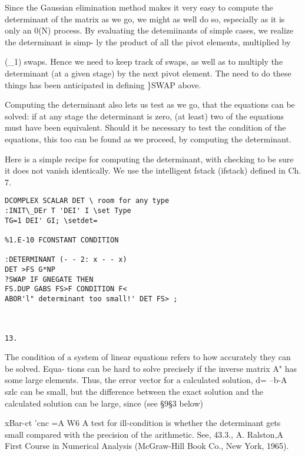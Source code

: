 {{%


Since the Gaussian elimination method makes it very easy to
compute the determinant of the matrix as we go, we might as well
do so, especially as it is only an 0(N) process. By evaluating the
detemiinants of simple cases, we realize the determinant is simp-
ly the product of all the pivot elements, multiplied by

(\_1) swaps. Hence we need to keep track of swaps, as well as to
multiply the determinant (at a given stage) by the next pivot
element. The need to do these things has been anticipated in
defining \}SWAP above.

Computing the determinant also lets us test as we go, that the
equations can be solved: if at any stage the determinant is zero,
(at least) two of the equations must have been equivalent. Should
it be necessary to test the condition of the equations, this too
can be found as we proceed, by computing the determinant.

Here is a simple recipe for computing the determinant, with
checking to be sure it does not vanish identically. We use the
intelligent fstack (ifstack) defined in Ch. 7.

\begin{verbatim}
DCOMPLEX SCALAR DET \ room for any type
:INIT\_DEr T 'DEI' I \set Type
TG=1 DEI' GI; \setdet=

%1.E-10 FCONSTANT CONDITION

:DETERMINANT (- - 2: x - - x)
DET >FS G*NP
?SWAP IF GNEGATE THEN
FS.DUP GABS FS>F CONDITION F<
ABOR'l" determinant too small!' DET FS> ;

 

13.
\end{verbatim} 

The condition of a system of linear equations refers to how accurately they can be solved. Equa-
tions can be hard to solve precisely if the inverse matrix A" has some large elements. Thus, the
error vector for a calculated solution, d= --b-A szlc can be small, but the difference between the
exact solution and the calculated solution can be large, since (see \S9\S3 below)

xBar-ct 'cnc =A W6
A test for ill-condition is whether the determinant gets small compared with the precision of the
arithmetic. See, 43.3., A. Ralston,A First Course in Numerical Analysis (McGraw-Hill Book Co.,
New York, 1965).


}}
